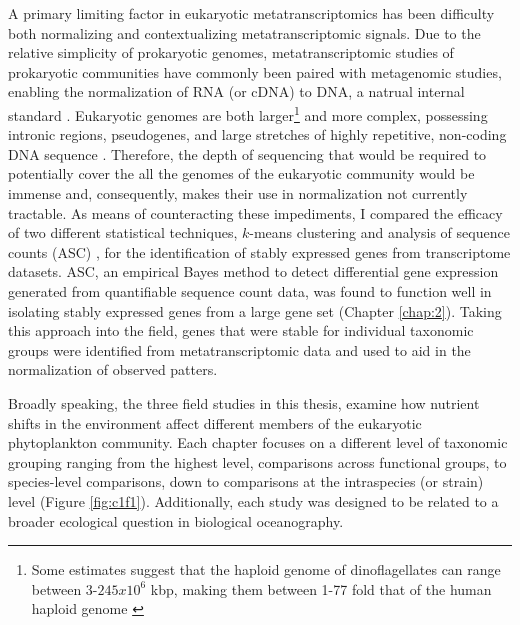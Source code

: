 A primary limiting factor in eukaryotic metatranscriptomics has been difficulty both normalizing and contextualizing metatranscriptomic signals. Due to the relative simplicity of prokaryotic genomes, metatranscriptomic studies of prokaryotic communities have commonly been paired with metagenomic studies, enabling the normalization of RNA (or cDNA) to DNA, a natrual internal standard \citep{Frias-Lopez2008, McCarren2010, Shi2011}. Eukaryotic genomes are both larger\footnote{Some estimates suggest that the haploid genome of dinoflagellates can range between 3-$245 x 10^6$ kbp, making them between 1-77 fold that of the human haploid genome \citep{Hou2009}} and more complex, possessing intronic regions, pseudogenes, and large stretches of highly repetitive, non-coding DNA sequence \citep{Taft2007}. Therefore, the depth of sequencing that would be required to potentially cover the all the genomes of the eukaryotic community would be immense and, consequently, makes their use in normalization not currently tractable. As means of counteracting these impediments, I compared the efficacy of two different statistical techniques, $k$-means clustering \citep{Hartigan1979} and analysis of sequence counts (ASC) \citep{Wu2010}, for the identification of stably expressed genes from transcriptome datasets. ASC, an empirical Bayes method to detect differential gene expression generated from quantifiable sequence count data, was found to function well in isolating stably expressed genes from a large gene set (Chapter \ref{chap:2}). Taking this approach into the field, genes that were stable for individual taxonomic groups were identified from metatranscriptomic data and used to aid in the normalization of observed patters. \par

Broadly speaking, the three field studies in this thesis, examine how nutrient shifts in the environment affect different members of the eukaryotic phytoplankton community. Each chapter focuses on a different level of taxonomic grouping ranging from the highest level, comparisons across functional groups, to species-level comparisons, down to comparisons at the intraspecies (or strain) level (Figure \ref{fig:c1f1}). Additionally, each study was designed to be related to a broader ecological question in biological oceanography. \par 



